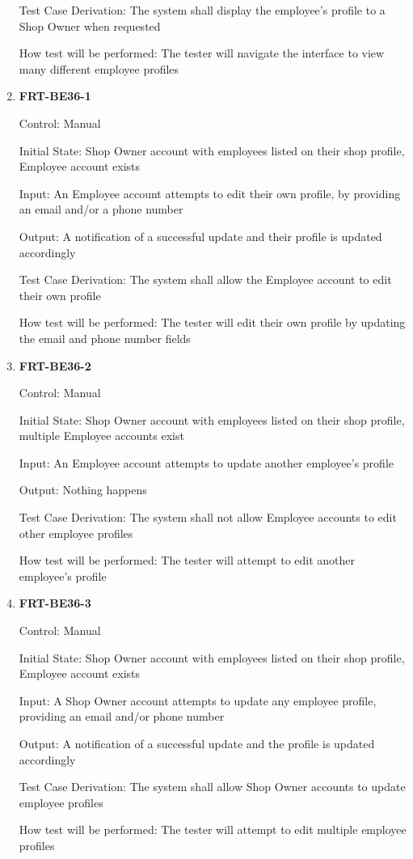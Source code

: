 \documentclass[12pt, titlepage]{article}
\begin{document}
\begin{enumerate}
	      Test Case Derivation: The system shall display the employee's profile to a Shop Owner when
	      requested

	      How test will be performed: The tester will navigate the interface to view many different employee
	      profiles

	\item \textbf{FRT-BE36-1}

	      Control: Manual

	      Initial State: Shop Owner account with employees listed on their shop profile, Employee account
	      exists

	      Input: An Employee account attempts to edit their own profile, by providing an email and/or a phone
	      number

	      Output: A notification of a successful update and their profile is updated accordingly

	      Test Case Derivation: The system shall allow the Employee account to edit their own profile

	      How test will be performed: The tester will edit their own profile by updating the email and phone
	      number fields

	\item \textbf{FRT-BE36-2}

	      Control: Manual

	      Initial State: Shop Owner account with employees listed on their shop profile, multiple Employee
	      accounts exist

	      Input: An Employee account attempts to update another employee's profile

	      Output: Nothing happens

	      Test Case Derivation: The system shall not allow Employee accounts to edit other employee profiles

	      How test will be performed: The tester will attempt to edit another employee's profile

	\item \textbf{FRT-BE36-3}

	      Control: Manual

	      Initial State: Shop Owner account with employees listed on their shop profile, Employee account
	      exists

	      Input: A Shop Owner account attempts to update any employee profile, providing an email and/or
	      phone number

	      Output: A notification of a successful update and the profile is updated accordingly

	      Test Case Derivation: The system shall allow Shop Owner accounts to update employee profiles

	      How test will be performed: The tester will attempt to edit multiple employee profiles

\end{enumerate}
\end{document}
